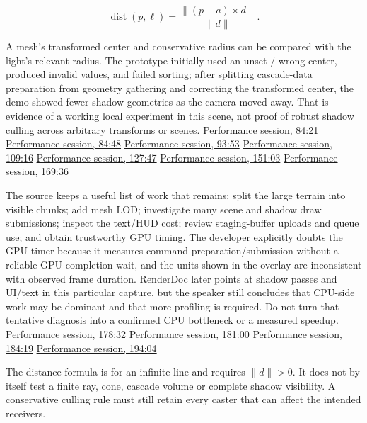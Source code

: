 \[
\operatorname{dist}(p,\ell)=\frac{\lVert(p-a)\times d\rVert}{\lVert d\rVert}.
\]

A mesh's transformed center and conservative radius can be compared with the light's relevant radius. The prototype initially used an unset / wrong center, produced invalid values, and failed sorting; after splitting cascade-data preparation from geometry gathering and correcting the transformed center, the demo showed fewer shadow geometries as the camera moved away. That is evidence of a working local experiment in this scene, not proof of robust shadow culling across arbitrary transforms or scenes. \href{https://www.youtube.com/watch?v=dJYWL9YAelY&t=5061s}{Performance session, 84:21} \href{https://www.youtube.com/watch?v=dJYWL9YAelY&t=5088s}{Performance session, 84:48} \href{https://www.youtube.com/watch?v=dJYWL9YAelY&t=5633s}{Performance session, 93:53} \href{https://www.youtube.com/watch?v=dJYWL9YAelY&t=6556s}{Performance session, 109:16} \href{https://www.youtube.com/watch?v=dJYWL9YAelY&t=7667s}{Performance session, 127:47} \href{https://www.youtube.com/watch?v=dJYWL9YAelY&t=9063s}{Performance session, 151:03} \href{https://www.youtube.com/watch?v=dJYWL9YAelY&t=10176s}{Performance session, 169:36}

The source keeps a useful list of work that remains: split the large terrain into visible chunks; add mesh LOD; investigate many scene and shadow draw submissions; inspect the text/HUD cost; review staging-buffer uploads and queue use; and obtain trustworthy GPU timing. The developer explicitly doubts the GPU timer because it measures command preparation/submission without a reliable GPU completion wait, and the units shown in the overlay are inconsistent with observed frame duration. RenderDoc later points at shadow passes and UI/text in this particular capture, but the speaker still concludes that CPU-side work may be dominant and that more profiling is required. Do not turn that tentative diagnosis into a confirmed CPU bottleneck or a measured speedup. \href{https://www.youtube.com/watch?v=dJYWL9YAelY&t=10712s}{Performance session, 178:32} \href{https://www.youtube.com/watch?v=dJYWL9YAelY&t=10857s}{Performance session, 181:00} \href{https://www.youtube.com/watch?v=dJYWL9YAelY&t=11059s}{Performance session, 184:19} \href{https://www.youtube.com/watch?v=dJYWL9YAelY&t=11644s}{Performance session, 194:04}

The distance formula is for an infinite line and requires \(\lVert d\rVert>0\). It does not by itself test a finite ray, cone, cascade volume or complete shadow visibility. A conservative culling rule must still retain every caster that can affect the intended receivers.

